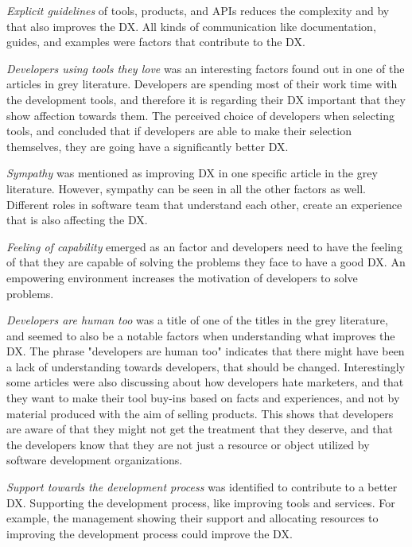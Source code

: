 \documentclass[english, 12pt, a4paper, sci, utf8, a-1b, online]{aaltothesis}
\newcounter{subsubsubsection}[subsubsection]
\begin{document}
\textit{Explicit guidelines} of tools, products, and APIs reduces the complexity and by that also improves the DX. All kinds of communication like documentation, guides, and examples were factors that contribute to the DX.

\textit{Developers using tools they love} was an interesting factors found out in one of the articles in grey literature. Developers are spending most of their work time with the development tools, and therefore it is regarding their DX important that they show affection towards them. The perceived choice of developers when selecting tools, and concluded that if developers are able to make their selection themselves, they are going have a significantly better DX.

\textit{Sympathy} was mentioned as improving DX in one specific article in the grey literature. However, sympathy can be seen in all the other factors as well. Different roles in software team that understand each other, create an experience that is also affecting the DX.

\textit{Feeling of capability} emerged as an factor and developers need to have the feeling of that they are capable of solving the problems they face to have a good DX. An empowering environment increases the motivation of developers to solve problems.

\textit{Developers are human too} was a title of one of the titles in the grey literature, and seemed to also be a notable factors when understanding what improves the DX. The phrase "developers are human too" indicates that there might have been a lack of understanding towards developers, that should be changed. Interestingly some articles were also discussing about how developers hate marketers, and that they want to make their tool buy-ins based on facts and experiences, and not by material produced with the aim of selling products. This shows that developers are aware of that they might not get the treatment that they deserve, and that the developers know that they are not just a resource or object utilized by software development organizations.

\textit{Support towards the development process} was identified to contribute to a better DX. Supporting the development process, like improving tools and services. For example, the management showing their support and allocating resources to improving the development process could improve the DX.

\end{document}
